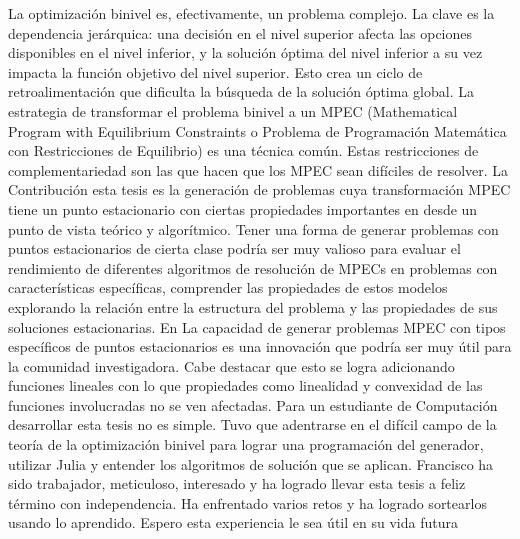 \begin{opinion}
    La optimización binivel es, efectivamente, un problema complejo. La clave es la dependencia jerárquica: una decisión en el nivel superior afecta las opciones disponibles en el nivel inferior, y la solución óptima del nivel inferior a su vez impacta la función objetivo del nivel superior. Esto crea un ciclo de retroalimentación que dificulta la búsqueda de la solución óptima global. La estrategia de transformar el problema binivel a un MPEC (Mathematical Program with Equilibrium Constraints o Problema de Programación Matemática con Restricciones de Equilibrio) es una técnica común. Estas restricciones de complementariedad son las que hacen que los MPEC sean difíciles de resolver. La Contribución esta tesis es la generación de problemas cuya transformación MPEC tiene un punto estacionario con ciertas propiedades importantes en desde un punto de vista teórico y algorítmico. Tener una forma de generar problemas con puntos estacionarios de cierta clase podría ser muy valioso para evaluar el rendimiento de diferentes algoritmos de resolución de MPECs en problemas con características específicas, comprender las propiedades de estos modelos explorando la relación entre la estructura del problema y las propiedades de sus soluciones estacionarias. En
    La capacidad de generar problemas MPEC con tipos específicos de puntos estacionarios es una innovación que podría ser muy útil para la comunidad investigadora. Cabe destacar que esto se logra adicionando funciones lineales con lo que propiedades como linealidad y convexidad de las funciones involucradas no se ven afectadas.
   Para un estudiante de Computación desarrollar esta tesis no es simple. Tuvo que adentrarse en el difícil campo de la teoría de la optimización binivel para lograr una programación del generador, utilizar Julia y entender los algoritmos de solución que se aplican.
   Francisco ha sido trabajador, meticuloso, interesado y ha logrado llevar esta tesis a feliz término con independencia. Ha enfrentado varios retos y ha logrado sortearlos usando lo aprendido. Espero esta experiencia le sea útil en su vida futura
\end{opinion}